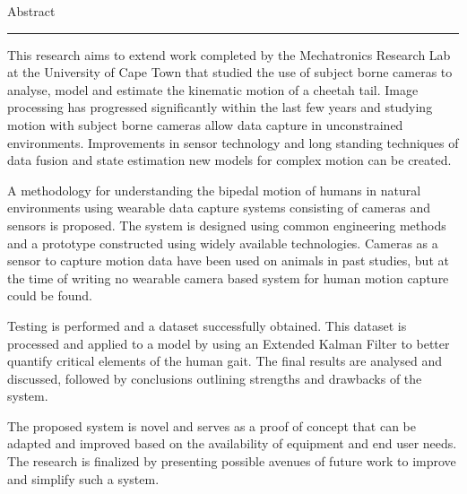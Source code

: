 \pagestyle{plain}


{\Large Abstract}
\vskip 5mm
\hrule
\vskip 5mm

This research aims to extend work completed by the Mechatronics Research Lab at the University of Cape Town that studied the use of subject borne cameras to analyse, model and estimate the kinematic motion of a cheetah tail. Image processing has progressed significantly within the last few years and studying motion with subject borne cameras allow data capture in unconstrained environments. Improvements in sensor technology and long standing techniques of data fusion and state estimation new models for complex motion can be created.

A methodology for understanding the bipedal motion of humans in natural environments using wearable data capture systems consisting of cameras and sensors is proposed. The system is designed using common engineering methods and a prototype constructed using widely available technologies. Cameras as a sensor to capture motion data have been used on animals in past studies, but at the time of writing no wearable camera based system for human motion capture could be found.  

Testing is performed and a dataset successfully obtained. This dataset is processed and applied to a model by using an Extended Kalman Filter to better quantify critical elements of the human gait. The final results are analysed and discussed, followed by conclusions outlining strengths and drawbacks of the system.

The proposed system is novel and serves as a proof of concept that can be adapted and improved based on the availability of equipment and end user needs. The research is finalized by presenting possible avenues of future work to improve and simplify such a system.

